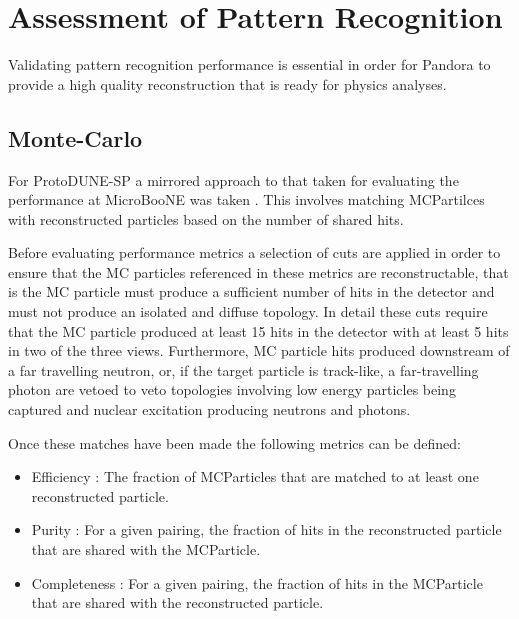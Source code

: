 \section{Assessment of Pattern Recognition}
\label{sec:assesmentpatrec}
Validating pattern recognition performance is essential in order for Pandora to provide a high quality reconstruction that is ready for physics analyses.  

\subsection{Monte-Carlo}
\label{sec:mcmetrics}

For ProtoDUNE-SP a mirrored approach to that taken for evaluating the performance at MicroBooNE was taken \cite{pandorauboone}.  This involves matching MCPartilces with reconstructed particles based on the number of shared hits.  

Before evaluating performance metrics a selection of cuts are applied in order to ensure that the MC particles referenced in these metrics are reconstructable, that is the MC particle must produce a sufficient number of hits in the detector and must not produce an isolated and diffuse topology.  In detail these cuts require that the MC particle produced at least 15 hits in the detector with at least 5 hits in two of the three views.  Furthermore, MC particle hits produced downstream of a far travelling neutron, or, if the target particle is track-like, a far-travelling photon are vetoed to veto topologies involving low energy particles being captured and nuclear excitation producing neutrons and photons.

Once these matches have been made the following metrics can be defined:

\begin{itemize}
    \item Efficiency : The fraction of MCParticles that are matched to at least one reconstructed particle.
    \item Purity : For a given pairing, the fraction of hits in the reconstructed particle that are shared with the MCParticle.
    \item Completeness : For a given pairing, the fraction of hits in the MCParticle that are shared with the reconstructed particle.
\end{itemize}

